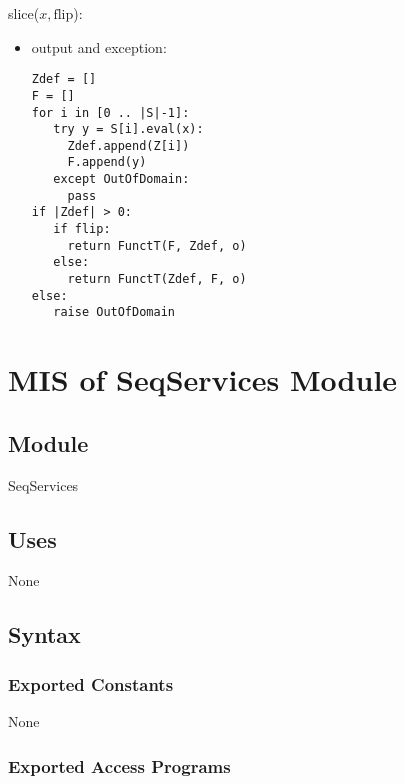 \documentclass[12pt, titlepage]{article}
\begin{document}
\noindent slice($x, \text{flip}$):
\begin{itemize}
\item output and exception:
\begin{verbatim}
Zdef = []
F = []
for i in [0 .. |S|-1]:
   try y = S[i].eval(x):
     Zdef.append(Z[i])
     F.append(y)
   except OutOfDomain:
     pass
if |Zdef| > 0:
   if flip:
     return FunctT(F, Zdef, o)
   else:
     return FunctT(Zdef, F, o)
else:
   raise OutOfDomain
\end{verbatim}
\end{itemize}

\newpage


\section{MIS of SeqServices Module} \label{SeqServices}

\subsection {Module}

SeqServices

\subsection {Uses}

None

\subsection {Syntax}

\subsubsection {Exported Constants}

None

\subsubsection {Exported Access Programs}
\end{document}
